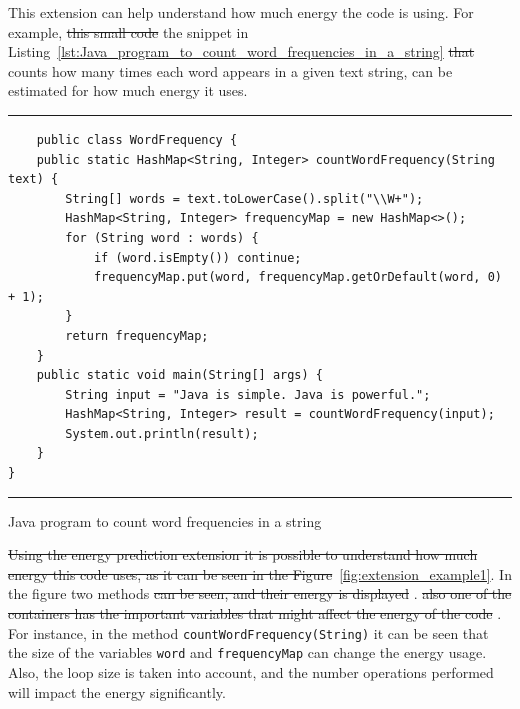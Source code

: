 This extension can help understand how much energy the code is using.
For example, \st{this small code} the snippet in Listing~\ref{lst:Java_program_to_count_word_frequencies_in_a_string} \st{that} counts how many times each word appears in a given text string, can be estimated for how much energy it uses.

\begin{listing}[htbp]
\noindent\rule{\linewidth}{0.4pt}
\begin{verbatim}
    public class WordFrequency {
    public static HashMap<String, Integer> countWordFrequency(String text) {
        String[] words = text.toLowerCase().split("\\W+");
        HashMap<String, Integer> frequencyMap = new HashMap<>();
        for (String word : words) {
            if (word.isEmpty()) continue; 
            frequencyMap.put(word, frequencyMap.getOrDefault(word, 0) + 1);
        }
        return frequencyMap;
    }
    public static void main(String[] args) {
        String input = "Java is simple. Java is powerful.";
        HashMap<String, Integer> result = countWordFrequency(input);
        System.out.println(result);
    }
}
\end{verbatim}
\noindent\rule{\linewidth}{0.4pt}
\caption{Java program to count word frequencies in a string}            
\label{lst:Java_program_to_count_word_frequencies_in_a_string}
\end{listing}

\st{Using the energy prediction extension it is possible to understand how much energy this code uses, as it can be seen in the Figure}~\ref{fig:extension_example1}.
 In the figure two methods \st{can be seen, and their energy is displayed} . \st{also one of the containers has the important variables that might affect the energy of the code} . For instance, in the method \texttt{countWordFrequency(String)} it can be seen that the size of the variables \texttt{word} and \texttt{frequencyMap} can change the energy usage. Also, the loop size is taken into account, and the number operations performed will impact the energy significantly.

